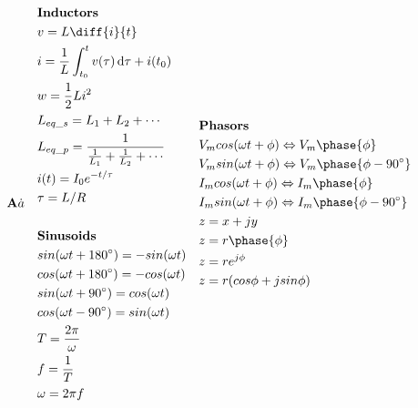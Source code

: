 \documentclass[10pt,letterpaper]{report}
\begin{document}
\fancyhead{} %

\large 
\begin{equation*}
\quad
\begin{split}
	\textbf{A}\dot{a}
\end{split}
\quad
\begin{split}
	&\text{\textbf{Inductors}} \\
  &v = L \diff{i}{t} \\
  &i = \frac{1}{L} \int_{t_0}^t v(\tau)\, \mathrm{d}{\tau} + i(t_0)\\
  &w = \frac{1}{2}Li^2 \\
  &L_{eq\_s} = L_1 + L_2 + \cdots \\
  &L_{eq\_p} = \frac{1}{\frac{1}{L_1} + \frac{1}{L_2} + \cdots} \\
  &i(t) = I_0e^{-t/\tau} \\
  &\tau = L/R \\
  & \\
  & \text{\textbf{Sinusoids}} \\
	&sin(\omega t + 180^{\circ}) = - sin (\omega t) \\
	&cos(\omega t + 180^{\circ}) = - cos (\omega t) \\
	&sin(\omega t + 90^{\circ}) = cos (\omega t) \\
	&cos(\omega t - 90^{\circ}) = sin (\omega t) \\
	&T = \frac{2 \pi}{\omega}  \\
	& f = \frac{1}{T} \\
	& \omega = 2 \pi f
\end{split}
\quad
\begin{split}
	&\text{\textbf{Phasors}} \\
	&V_m cos(\omega t + \phi) \Leftrightarrow V_m \phase{\phi} \\
	&V_m sin(\omega t + \phi) \Leftrightarrow V_m \phase{\phi - 90^{\circ}} \\
	&I_m cos(\omega t + \phi) \Leftrightarrow I_m \phase{\phi} \\
	&I_m sin(\omega t + \phi) \Leftrightarrow I_m \phase{\phi - 90^{\circ}} \\		
	&z = x + jy \\
	&z = r \phase{\phi} \\
	& z = re^{j\phi} \\
	&z = r (cos \phi + j sin \phi) \\

\end{split}
\end{equation*}
\end{document}
